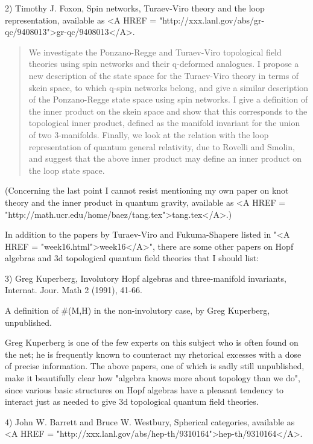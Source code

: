 2) Timothy J. Foxon, Spin networks, Turaev-Viro theory and the loop 
representation, available as 
<A HREF = "http://xxx.lanl.gov/abs/gr-qc/9408013">gr-qc/9408013</A>.

\begin{quote}

We investigate the Ponzano-Regge and Turaev-Viro topological field theories
using spin networks and their q-deformed analogues. I propose a new
description of the state space for the Turaev-Viro theory in terms of skein
space, to which q-spin networks belong, and give a similar description of
the Ponzano-Regge state space using spin networks.
I give a definition of the inner product on the skein space and show
that this corresponds to the topological inner product, defined as the
manifold invariant for the union of two 3-manifolds.
Finally, we look at the relation with the loop representation of quantum
general relativity, due to Rovelli and Smolin, and suggest that the above
inner product may define an inner product on the loop state space.
\end{quote}

(Concerning the last point I cannot resist mentioning my own paper on 
knot theory and the inner product in quantum gravity, available as
<A HREF = "http://math.ucr.edu/home/baez/tang.tex">tang.tex</A>.)


In addition to the papers by Turaev-Viro and Fukuma-Shapere listed in
"<A HREF = "week16.html">week16</A>", there are some other papers on Hopf algebras and 3d
topological quantum field theories that I should list:

3) Greg Kuperberg, Involutory Hopf algebras and three-manifold invariants, 
Internat. Jour. Math 2 (1991), 41-66.

A definition of #(M,H) in the non-involutory case, by Greg Kuperberg,
unpublished.  

Greg Kuperberg is one of the few experts on this subject who is often
found on the net; he is frequently known to counteract my rhetorical
excesses with a dose of precise information.  The above papers, one of
which is sadly still unpublished, make it beautifully clear how "algebra
knows more about topology than we do", since various basic structures
on Hopf algebras have a pleasant tendency to interact just as needed
to give 3d topological quantum field theories.  

4) John W. Barrett and Bruce W. Westbury,
Spherical categories, 
available as 
<A HREF = "http://xxx.lanl.gov/abs/hep-th/9310164">hep-th/9310164</A>.

